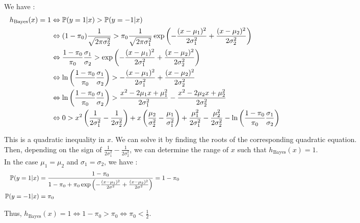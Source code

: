 \documentclass[12pt,a4paper]{article}
\begin{document}
\color{blue}
\noindent We have :
\begin{align*}
    h_{\text{Bayes}}(x) = 1 &\Leftrightarrow \mathbb{P}(y = 1 | x) > \mathbb{P}(y = -1 | x) \hspace{14.5cm} \\
    &\Leftrightarrow (1 - \pi_0)\frac{1}{\sqrt{2\pi\sigma_2^2}} > \pi_0\frac{1}{\sqrt{2\pi\sigma_1^2}} \exp\left( -\frac{(x - \mu_1)^2}{2\sigma_1^2} + \frac{(x - \mu_2)^2}{2\sigma_2^2} \right) \\
    &\Leftrightarrow \frac{1 - \pi_0}{\pi_0} \frac{\sigma_1}{\sigma_2} > \exp\left( -\frac{(x - \mu_1)^2}{2\sigma_1^2} + \frac{(x - \mu_2)^2}{2\sigma_2^2} \right) \\
    &\Leftrightarrow \ln\left( \frac{1 - \pi_0}{\pi_0} \frac{\sigma_1}{\sigma_2} \right) > -\frac{(x - \mu_1)^2}{2\sigma_1^2} + \frac{(x - \mu_2)^2}{2\sigma_2^2} \\
    &\Leftrightarrow \ln\left( \frac{1 - \pi_0}{\pi_0} \frac{\sigma_1}{\sigma_2} \right) > \frac{x^2 - 2\mu_1x + \mu_1^2}{2\sigma_1^2} - \frac{x^2 - 2\mu_2x + \mu_2^2}{2\sigma_2^2} \\
    &\Leftrightarrow 0 > x^2\left( \frac{1}{2\sigma_1^2} - \frac{1}{2\sigma_2^2} \right) + x\left( \frac{\mu_2}{\sigma_2^2} - \frac{\mu_1}{\sigma_1^2} \right) + \frac{\mu_1^2}{2\sigma_1^2} - \frac{\mu_2^2}{2\sigma_2^2} - \ln\left( \frac{1 - \pi_0}{\pi_0} \frac{\sigma_1}{\sigma_2} \right) \\
\end{align*}

\noindent This is a quadratic inequality in $x$. We can solve it by finding the roots of the corresponding quadratic equation.\\
Then, depending on the sign of $\frac{1}{2\sigma_1^2} - \frac{1}{2\sigma_2^2}$, we can determine the range of $x$ such that $h_{\text{Bayes}}(x) = 1$.\\

\noindent In the case $\mu_1 = \mu_2$ and $\sigma_1 = \sigma_2$, we have :
\begin{align*}
    \mathbb{P}(y = 1 | x) &= \frac{1 - \pi_0}{1 - \pi_0 + \pi_0\exp\left( -\frac{(x - \mu_1)^2}{2\sigma^2} + \frac{(x - \mu_2)^2}{2\sigma^2} \right)} = 1 - \pi_0 \hspace{14.5cm} \\
    \mathbb{P}(y = -1 | x) &= \pi_0 \\
\end{align*}

\noindent Thus, $h_{\text{Bayes}}(x) = 1 \Leftrightarrow 1 - \pi_0 > \pi_0 \Leftrightarrow \pi_0 < \frac{1}{2}$.\\
\end{document}
